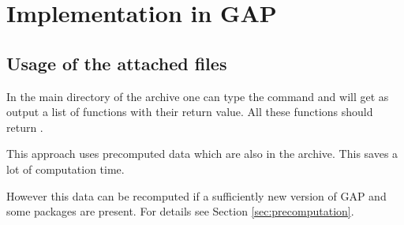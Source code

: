 \documentclass[a4paper,11pt]{amsart}
\begin{document}
\section{Implementation in GAP}
\subsection{Usage of the attached files} \label{sec:gap_verify}
In the main directory of the archive one can type the command  and 
will get as output a list of functions with their return value. All these functions should
return . 

This approach uses precomputed data which are also in the archive. This saves a lot of
computation time.

However this data can be recomputed if a sufficiently new version of GAP and
some packages are present. For details see Section \ref{sec:precomputation}.
\end{document}
